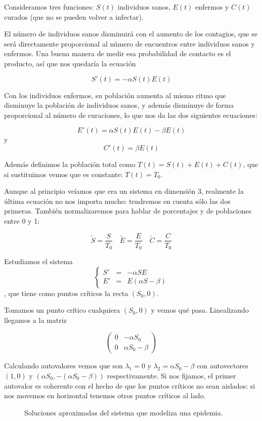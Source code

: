Consideramos tres funciones: $S(t)$ individuos sanos, $E(t)$ enfermos y $C(t)$ curados (que no se pueden volver a infectar).

El número de individuos sanos disminuirá con el aumento de los contagios, que se será directamente proporcional al número de encuentros entre individuos sanos y enfermos. Una buena manera de medir esa probabilidad de contacto es el producto, así que nos quedaría la ecuación

\[ S'(t) = -αS(t) E(t) \]

Con los individuos enfermos, su población aumenta al mismo ritmo que disminuye la población de individuos sanos, y además disminuye de forma proporcional al número de curaciones, lo que nos da las dos siguientes ecuaciones:

\[ E'(t) = α S(t) E(t) - βE(t) \] y \[ C'(t) = βE(t) \]

Además definimos la población total como $T(t) = S(t) + E(t) + C(t)$, que si sustituimos vemos que es constante: $T(t) = T_0$.

Aunque al principio veíamos que era un sistema en dimensión 3, realmente la última ecuación no nos importa mucho: tendremos en cuenta sólo las dos primeras. También normalizaremos para hablar de porcentajes y de poblaciones entre 0 y 1:

\[ \tilde{S} = \frac{S}{T_0} \quad \tilde{E} = \frac{E}{T_0} \quad \tilde{C} = \frac{C}{T_0} \]

Estudiamos el sistema \[ \left\{\begin{array}{rcl} S' &=& -αSE \\ E' &=& E(αS - β) \end{array}\right. \], que tiene como puntos críticos la recta $(S_0, 0)$.

Tomamos un punto crítico cualquiera $(S_0,0)$ y vemos qué pasa. Linealizando llegamos a la matriz

\[ \begin{pmatrix}
0 & -αS_0 \\ 0 & αS_0 -β
\end{pmatrix} \]

Calculando autovalores vemos que son $λ_1 = 0$ y $λ_2 = αS_0 - β$ con autovectores $(1,0)$ y $(αS_0, -(αS_0 - β))$ respectivamente. Si nos fijamos, el primer autovalor es coherente con el hecho de que los puntos críticos no sean aislados: si nos movemos en horizontal tenemos otros puntos críticos al lado.

\begin{figure}[hbtp]
\centering
{}
\label{img8-Epidemia}
\caption{Soluciones aproximadas del sistema que modeliza una epidemia.}
\end{figure}

